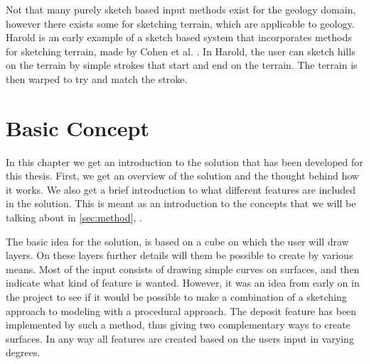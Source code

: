 \documentclass[a4paper,12pt]{report}
\newcommand{\secref}[1]{\autoref{#1}, \nameref{#1}}
\begin{document}
Not that many purely sketch based input methods exist for the geology domain, however there exists some for sketching terrain, which are applicable to geology. Harold is an early example of a sketch based system that incorporates methods for sketching terrain, made by Cohen et al. \cite{cohen2000harold}. In Harold, the user can sketch hills on the terrain by simple strokes that start and end on the terrain. The terrain is then warped to try and match the stroke. 





\clearpage
\chapter{Basic Concept}
In this chapter we get an introduction to the solution that has been developed for this thesis. First, we get an overview of the solution and the thought behind how it works. We also get a brief introduction to what different features are included in the solution. This is meant as an introduction to the concepts that we will be talking about in \secref{sec:method}.
\label{sec:concept}

The basic idea for the solution, is based on a cube on which the user will draw layers. On these layers further details will them be possible to create by various means. Most of the input consists of drawing simple curves on surfaces, and then indicate what kind of feature is wanted. However, it was an idea from early on in the project to see if it would be possible to make a combination of a sketching approach to modeling with a procedural approach. The deposit feature has been implemented by such a method, thus giving two complementary ways to create surfaces. In any way all features are created based on the users input in varying degrees.
\end{document}
